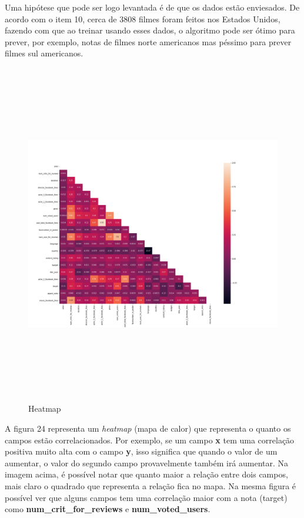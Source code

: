 Uma hipótese que pode ser logo levantada é de que os dados estão enviesados. De acordo com o item 10, cerca de 3808 filmes foram feitos nos Estados Unidos, fazendo com que ao treinar usando esses dados, o algoritmo pode ser ótimo para prever, por exemplo, notas de filmes norte americanos mas péssimo para prever filmes sul americanos.


\begin{figure}[H]
\centering
\includegraphics[height=15cm]{imagens/heatmap.png}
\caption{Heatmap}
\label{figura24}
\end{figure}
A figura 24 representa um \textit{heatmap} (mapa de calor) que representa o quanto os campos estão correlacionados. Por exemplo, se um campo \textbf{x} tem uma correlação positiva muito alta com o campo \textbf{y}, isso significa que quando o valor de um aumentar, o valor do segundo campo provavelmente também irá aumentar. Na imagem acima, é possível notar que quanto maior a relação entre dois campos, mais claro o quadrado que representa a relação fica no mapa. 
Na mesma figura é possível ver que alguns campos tem uma correlação maior com a nota (target) como \textbf{num\_crit\_for\_reviews} e \textbf{num\_voted\_users}. 

